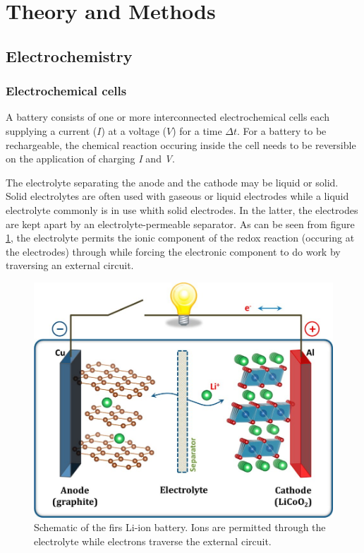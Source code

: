 \documentclass[Main/main.tex]{subfiles}
\begin{document}
\section{Theory and Methods}


\subsection{Electrochemistry}

\subsubsection{Electrochemical cells}

A battery consists of one or more interconnected electrochemical cells each supplying a current ($I$) at a voltage ($V$) for a time $\Delta t$. For a battery to be rechargeable, the chemical reaction occuring inside the cell needs to be reversible on the application of charging \textit{I} and \textit{V}.

The electrolyte separating the anode and the cathode may be liquid or solid. Solid electrolytes are often used with gaseous or liquid electrodes while a liquid electrolyte commonly is in use whith solid electrodes. In the latter, the electrodes are kept apart by an electrolyte-permeable separator. As can be seen from figure \ref{fig:2_jacs}, the electrolyte permits the ionic component of the redox reaction (occuring at the electrodes) through while forcing the electronic component to do work by traversing an external circuit. 

\begin{figure}[h]
	\centering
	\includegraphics[width=0.7\linewidth]{uploads/JACS}
	\caption{Schematic of the firs Li-ion battery. Ions are permitted through the electrolyte while electrons traverse the external circuit.}
	\label{fig:2_jacs}
\end{figure}
\end{document}
